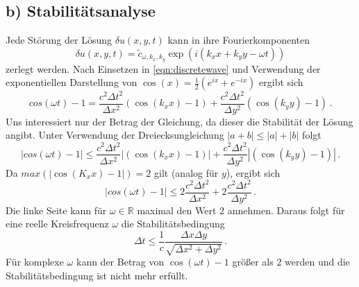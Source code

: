 \subsection{b) Stabilitätsanalyse}
Jede Störung der Lösung $\delta u(x,y,t)$ kann in ihre Fourierkomponenten
\begin{equation}
    \delta u(x,y,t) = \tilde{c}_{\omega,k_x,k_y} \exp \left( i \left( k_x x + k_y y - \omega t \right) \right)
\end{equation}
zerlegt werden.
Nach Einsetzen in \autoref{eqn:discretewave} und Verwendung der exponentiellen Darstellung von $\cos(x) = \frac{1}{2} \left( e^{ix} + e^{-ix} \right)$ ergibt sich
\begin{equation*}
    cos(\omega t) - 1 = \frac{c^2 \Delta t^2}{\Delta x^2} (\cos(k_x x) - 1) + \frac{c^2 \Delta t^2}{\Delta y^2} (\cos(k_y y) - 1) \, .
\end{equation*}
Uns interessiert nur der Betrag der Gleichung, da dieser die Stabilität der Lösung angibt.
Unter Verwendung der Dreiecksungleichung $|a+b| \leq |a| + |b|$ folgt
\begin{equation*}
    |cos(\omega t) - 1| \leq \frac{c^2 \Delta t^2}{\Delta x^2} |(\cos(k_x x) - 1)| + \frac{c^2 \Delta t^2}{\Delta y^2} |(\cos(k_y y) - 1)| \, .
\end{equation*}
Da $max(|\cos(K_x x) - 1|) = 2$ gilt (analog für $y$), ergibt sich
\begin{equation*}
    |cos(\omega t) - 1| \leq 2 \frac{c^2 \Delta t^2}{\Delta x^2} + 2 \frac{c^2 \Delta t^2}{\Delta y^2} \, .
\end{equation*}
Die linke Seite kann für $\omega \in \mathbb{R}$ maximal den Wert $2$ annehmen.
Daraus folgt für eine reelle Kreisfrequenz $\omega$ die Stabilitätsbedingung
\begin{equation}
    \Delta t \leq \frac{1}{c} \frac{\Delta x \Delta y}{\sqrt{\Delta x^2 + \Delta y^2}} \, .
    \label{eqn:stability}
\end{equation}
Für komplexe $\omega$ kann der Betrag von $\cos(\omega t) - 1$ größer als $2$ werden und die Stabilitätsbedingung ist nicht mehr erfüllt.

